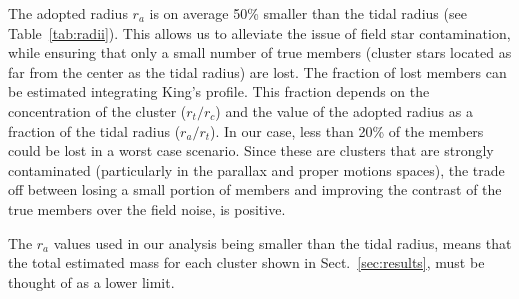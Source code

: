 \documentclass[draft]{aa}
\begin{document}
  The adopted radius $r_{a}$ is on average 50\% smaller than the
  tidal radius (see Table~\ref{tab:radii}). This allows us to alleviate the
  issue of field star contamination, while ensuring that only a small number of
  true members (cluster stars located as far from the center as the tidal
  radius) are lost.
  The fraction of lost members can be estimated integrating King's profile. This
  fraction depends on the concentration of the cluster ($r_{t}/r_{c}$) and the
  value of the adopted radius as a fraction of the tidal radius ($r_{a}/r_{t}$).
  In our case, less than 20\% of the members could be lost in a worst case
  scenario. Since these are clusters that are strongly contaminated 
  (particularly in the parallax and proper motions spaces), the trade off
  between losing a small portion of members and improving the contrast of the
  true members over the field noise, is positive.

  The $r_{a}$ values used in our analysis being smaller than the tidal radius,
  means that the total estimated mass for each cluster shown in
  Sect.~\ref{sec:results}, must be thought of as a lower limit.\\
\end{document}

